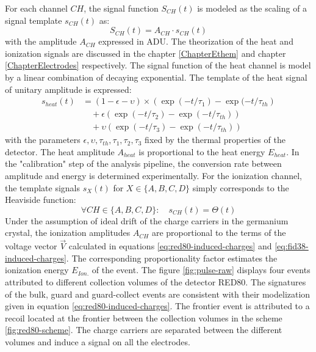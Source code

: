 For each channel $CH$, the signal function $S_{CH}(t)$ is modeled as the scaling of a signal template $s_{CH}(t)$ as:
\begin{equation}
S_{CH}(t) = A_{CH} \cdot s_{CH}(t)
\end{equation}
with the amplitude $A_{CH}$ expressed in ADU.
The theorization of the heat and ionization signals are discussed in the chapter \ref{ChapterEthem} and chapter \ref{ChapterElectrodes} respectively. The signal function of the heat channel is model by a linear combination of decaying exponential. The template of the heat signal of unitary amplitude is expressed:
\begin{equation}
\label{eq:heat-channel-signal-function}
\begin{split}
s_{heat}(t)
&=
(1 - \epsilon - \upsilon) \times \left( \exp(-t/\tau_{1}) - \exp(-t/\tau_{th} \right)
\\
& \quad +
\epsilon \left( \exp(-t/\tau_{2}) - \exp(-t/\tau_{th}) \right)
\\
& \quad +
\upsilon \left( \exp(-t/\tau_{3}) - \exp(-t/\tau_{th}) \right)
\end{split}
\end{equation}
with the parameters $\epsilon, \upsilon, \tau_{th}, \tau_1, \tau_2, \tau_3$ fixed by the thermal properties of the detector. The heat amplitude $A_{heat}$ is proportional to the heat energy $E_{heat}$. In the "calibration" step of the analysis pipeline, the conversion rate between amplitude and energy is determined experimentally. 
For the ionization channel, the template signals $s_{X}(t)$ for $X \in \{A,B,C,D\}$ simply corresponds to the Heaviside function:
\begin{equation}
\label{eq:ionization-channel-signal-function}
\forall CH \in \{A,B,C,D\}: \quad s_{CH}(t) = \Theta(t)
\end{equation}
Under the assumption of ideal drift of the charge carriers in the germanium crystal, the ionization amplitudes $A_{CH}$ are proportional to the terms of the voltage vector $\vec{V}$ calculated in equations \ref{eq:red80-induced-charges} and \ref{eq:fid38-induced-charges}. The corresponding proportionality factor estimates the ionization energy $E_{Ion.}$ of the event. The figure \ref{fig:pulse-raw} displays four events attributed to different collection volumes of the detector RED80. The signatures of the bulk, guard and guard-collect events are consistent with their modelization given in equation \ref{eq:red80-induced-charges}. The frontier event is attributed to a recoil located at the frontier between the collection volumes in the scheme \ref{fig:red80-scheme}. The charge carriers are separated between the different volumes and induce a signal on all the electrodes.



